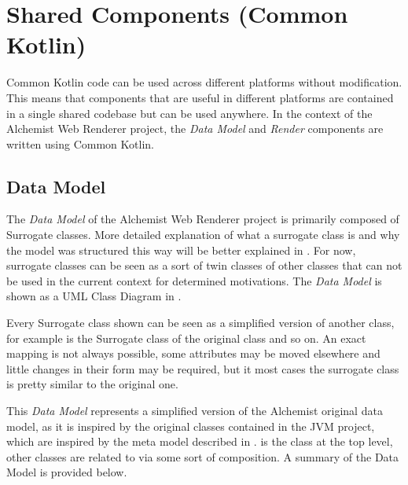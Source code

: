\section{Shared Components (Common Kotlin)}
\label{sec:shared-components-common-kotlin}
Common Kotlin code can be used across different platforms without modification. This means that components that are useful in different platforms are contained in a single shared codebase but can be used anywhere. In the context of the Alchemist Web Renderer project, the \textit{Data Model} and \textit{Render} components are written using Common Kotlin.
\subsection{Data Model}
\label{ssec:data-model}
The \textit{Data Model} of the Alchemist Web Renderer project is primarily composed of Surrogate classes. More detailed explanation of what a surrogate class is and why the model was structured this way will be better explained in . For now, surrogate classes can be seen as a sort of twin classes of other classes that can not be used in the current context for determined motivations. The \textit{Data Model} is shown as a UML Class Diagram in .\newline


Every Surrogate class shown can be seen as a simplified version of another class, for example  is the Surrogate class of the original  class and so on. An exact mapping is not always possible, some attributes may be moved elsewhere and little changes in their form may be required, but it most cases the surrogate class is pretty similar to the original one.\newline

This \textit{Data Model} represents a simplified version of the Alchemist original data model, as it is inspired by the original classes contained in the JVM project, which are inspired by the meta model described in .  is the class at the top level, other classes are related to  via some sort of composition. A summary of the Data Model is provided below.\newline

